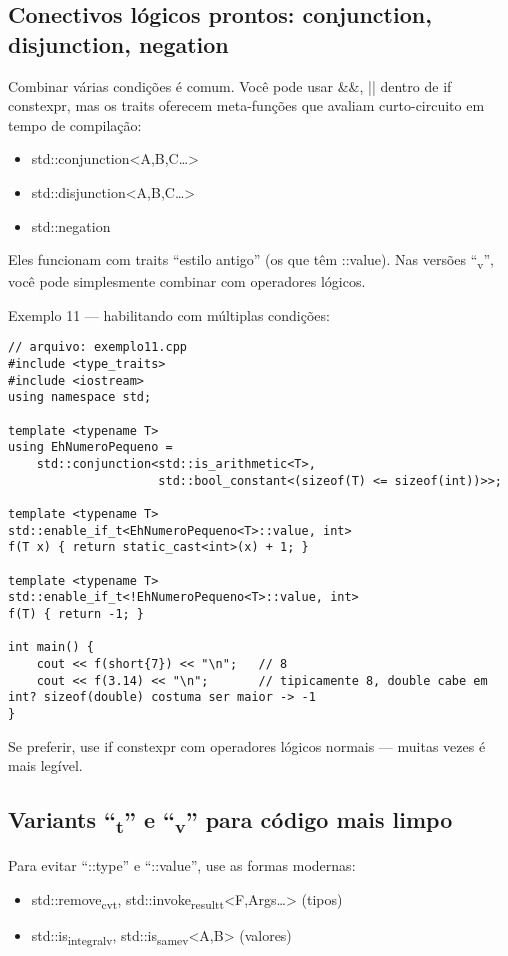 \documentclass[11pt]{article}
\begin{document}
\subsection{Conectivos lógicos prontos: conjunction, disjunction, negation}
\label{sec:orgb63d74e}

Combinar várias condições é comum. Você pode usar \&\&, || dentro de if constexpr, mas os traits oferecem meta-funções que avaliam curto-circuito em tempo de compilação:
\begin{itemize}
\item std::conjunction<A,B,C\ldots{}>
\item std::disjunction<A,B,C\ldots{}>
\item std::negation
\end{itemize}

Eles funcionam com traits “estilo antigo” (os que têm ::value). Nas versões “\textsubscript{v}”, você pode simplesmente combinar com operadores lógicos.

Exemplo 11 — habilitando com múltiplas condições:
\begin{verbatim}
// arquivo: exemplo11.cpp
#include <type_traits>
#include <iostream>
using namespace std;

template <typename T>
using EhNumeroPequeno =
    std::conjunction<std::is_arithmetic<T>,
                     std::bool_constant<(sizeof(T) <= sizeof(int))>>;

template <typename T>
std::enable_if_t<EhNumeroPequeno<T>::value, int>
f(T x) { return static_cast<int>(x) + 1; }

template <typename T>
std::enable_if_t<!EhNumeroPequeno<T>::value, int>
f(T) { return -1; }

int main() {
    cout << f(short{7}) << "\n";   // 8
    cout << f(3.14) << "\n";       // tipicamente 8, double cabe em int? sizeof(double) costuma ser maior -> -1
}
\end{verbatim}

Se preferir, use if constexpr com operadores lógicos normais — muitas vezes é mais legível.
\subsection{Variants “\textsubscript{t}” e “\textsubscript{v}” para código mais limpo}
\label{sec:org718e952}

Para evitar “::type” e “::value”, use as formas modernas:
\begin{itemize}
\item std::remove\textsubscript{cv}\textsubscript{t}, std::invoke\textsubscript{result}\textsubscript{t}<F,Args\ldots{}> (tipos)
\item std::is\textsubscript{integral}\textsubscript{v}, std::is\textsubscript{same}\textsubscript{v}<A,B> (valores)
\end{itemize}
\end{document}
